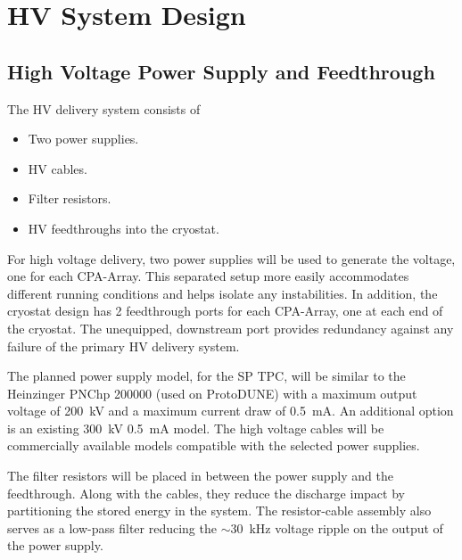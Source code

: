 \section{HV System Design}
\label{sec:fdsp-hv-design}

\subsection {High Voltage Power Supply and Feedthrough}
The HV delivery system consists of
\begin{itemize}
\item Two power supplies.
\item HV cables.
\item Filter resistors.
\item HV feedthroughs into the cryostat.
\end{itemize}

For high voltage delivery, two power supplies will be used to generate the voltage, one for each CPA-Array. This separated setup more easily accommodates different running conditions and helps isolate any instabilities. In addition, the cryostat design has 2 feedthrough ports for each CPA-Array, one at each end of the cryostat. The unequipped, downstream port provides redundancy against any failure of the primary HV delivery system. 

The planned power supply model, for the SP TPC, will be similar to the Heinzinger PNChp 200000 (used on ProtoDUNE) with a maximum output voltage of \SI{200}{kV} and a maximum current draw of \SI{0.5}{mA}.  An additional option is an existing \SI{300}{kV} \SI{0.5}{mA} model. The high voltage cables will be commercially available models compatible with the selected power supplies. 


The filter resistors will be placed in between the power supply and the feedthrough.  Along with the cables, they reduce the discharge impact by partitioning the stored energy in the system.  The resistor-cable assembly also serves as a low-pass filter reducing the $\sim$\SI{30}{kHz} voltage ripple on the output of the power supply.

